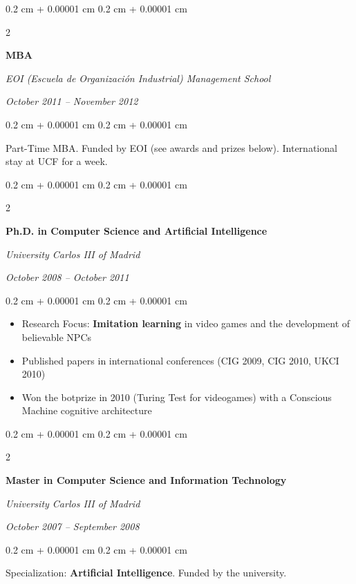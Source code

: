 \documentclass[10pt, letterpaper]{article}
\newenvironment{highlights}{
	\begin{itemize}[
		topsep=0.10 cm,
		parsep=0.10 cm,
		partopsep=0pt,
		itemsep=0pt,
		leftmargin=0.4 cm + 10pt
	]
	}{
	\end{itemize}
} %
\newenvironment{onecolentry}{
	\begin{adjustwidth}{
		0.2 cm + 0.00001 cm
	}{
		0.2 cm + 0.00001 cm
	}
	}{
	\end{adjustwidth}
} %
\newenvironment{twocolentry}[2][]{
	\onecolentry
	\def\secondColumn{#2}
	\setcolumnwidth{\fill, 5.5 cm}
	\begin{paracol}{2}
	}{
		\switchcolumn \raggedleft \secondColumn
	\end{paracol}
	\endonecolentry
} %
\begin{document}
	\vspace{0.2 cm}

	\begin{twocolentry}{
		\textit{October 2011 – November 2012}}
		\textbf{MBA}
		
		\textit{EOI (Escuela de Organización Industrial) Management School}
	\end{twocolentry}

	\vspace{0.10 cm}
	\begin{onecolentry}
		Part-Time MBA. Funded by EOI (see awards and prizes below). International stay at UCF for a week.
	\end{onecolentry}

	\vspace{0.2 cm}

	\begin{twocolentry}{
		\textit{October 2008 – October 2011}}
		\textbf{Ph.D. in Computer Science and Artificial Intelligence}
		
		\textit{University Carlos III of Madrid}
	\end{twocolentry}

	\vspace{0.10 cm}
	\begin{onecolentry}
		\begin{highlights}
			\item Research Focus: \textbf{Imitation learning} in video games and the development of believable NPCs
			\item Published papers in international conferences (CIG 2009, CIG 2010, UKCI 2010)
			\item Won the botprize in 2010 (Turing Test for videogames) with a Conscious Machine cognitive architecture
		\end{highlights}
	\end{onecolentry}

	\vspace{0.2 cm}

	\begin{twocolentry}{
		\textit{October 2007 – September 2008}}
		\textbf{Master in Computer Science and Information Technology}
		
		\textit{University Carlos III of Madrid}
	\end{twocolentry}

	\vspace{0.10 cm}
	\begin{onecolentry}
		Specialization: \textbf{Artificial Intelligence}. Funded by the university.
	\end{onecolentry}
\end{document}

